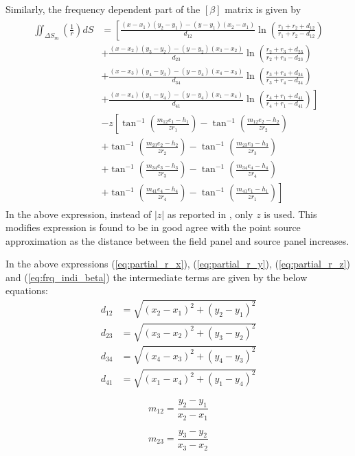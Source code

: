 Similarly, the frequency dependent part of the $[\beta]$ matrix is given by
\begin{align}
    \begin{split}
        \label{eq:frq_indi_beta}
       \iint_{\Delta S_m}{\left(\frac{1}{r}\right)} dS &= \left[\frac{(x-x_1)(y_2-y_1) - (y-y_1)(x_2-x_1)}{d_{12}}\ln\left(\frac{r_1+r_2+d_{12}}{r_1+r_2-d_{12}}\right)\right. \\
&+ \left.\frac{(x-x_2)(y_3-y_2)-(y-y_2)(x_3-x_2)}{d_{23}}\ln\left(\frac{r_2+r_3+d_{23}}{r_2+r_3-d_{23}}\right)\right. \\
&+ \left.\frac{(x-x_3)(y_4-y_3) -(y-y_4)(x_4-x_3)}{d_{34}}\ln\left(\frac{r_3+r_4+d_{34}}{r_3+r_4-d_{34}}\right)\right. \\
&+ \left.\frac{(x-x_4)(y_1-y_4) -(y-y_4)(x_1-x_4)}{d_{41}}\ln\left(\frac{r_4+r_1+d_{41}}{r_4+r_1-d_{41}}\right)\right] \\
&- z\left[\tan^{-1}\left(\frac{m_{12}e_1-h_1}{zr_1}\right)-\tan^{-1}\left(\frac{m_{12}e_2-h_2}{zr_2}\right)\right. \\
&+ \left.\tan^{-1}\left(\frac{m_{23}e_2-h_2}{zr_2}\right)-\tan^{-1}\left(\frac{m_{23}e_3-h_3}{zr_3}\right)\right.\\
&+ \left.\tan^{-1}\left(\frac{m_{34}e_3-h_3}{zr_3}\right)-\tan^{-1}\left(\frac{m_{34}e_4-h_4}{zr_4}\right)\right.\\
&+ \left.\tan^{-1}\left(\frac{m_{41}e_4-h_4}{zr_4}\right)-\tan^{-1}\left(\frac{m_{41}e_1-h_1}{zr_1}\right)\right] 
    \end{split}
\end{align}
In the above expression, instead of $|z|$ as reported in \cite{katz2001low}, only $z$ is used. This modifies expression is found 
to be in good agree with the point source approximation as the distance between the field panel and source panel increases.

In the above expressions (\ref{eq:partial_r_x}), (\ref{eq:partial_r_y}), (\ref{eq:partial_r_z}) and (\ref{eq:frq_indi_beta}) the intermediate terms are given by the below equations:
\begin{align}
    d_{12} &= \sqrt{(x_2-x_1)^2+(y_2-y_1)^2}\\
    d_{23} &= \sqrt{(x_3-x_2)^2+(y_3-y_2)^2}\\
    d_{34} &= \sqrt{(x_4-x_3)^2+(y_4-y_3)^2}\\
    d_{41} &= \sqrt{(x_1-x_4)^2+(y_1-y_4)^2}
\end{align}

\noindent\begin{minipage}{.5\linewidth}
    \begin{equation}
        m_{12} =\frac{y_2-y_1}{x_2-x_1}
    \end{equation}
    \end{minipage}%
    \begin{minipage}{.5\linewidth}
    \begin{equation}
        m_{23} =\frac{y_3-y_2}{x_3-x_2}
    \end{equation}
\end{minipage}

